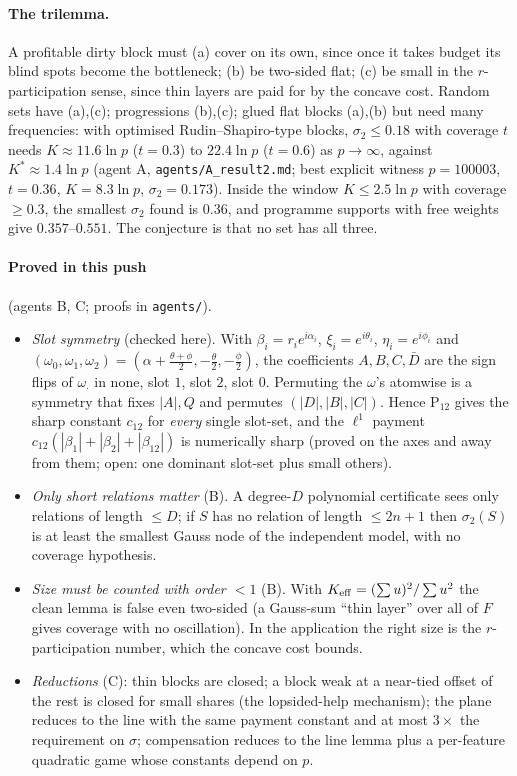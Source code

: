 \documentclass[11pt]{article}
\theoremstyle{definition}
\begin{document}
\paragraph{The trilemma.}  A profitable dirty block must (a) cover on its own, since once it takes budget its blind spots become the bottleneck; (b) be two-sided flat; (c) be small in the
$r$-participation sense, since thin layers are paid for by the concave cost.  Random sets have (a),(c); progressions (b),(c); glued flat blocks (a),(b) but need many frequencies: with optimised
Rudin--Shapiro-type blocks, $\sigma_2\le0.18$ with coverage $t$ needs $K\approx11.6\ln p$ ($t=0.3$) to $22.4\ln p$ ($t=0.6$) as $p\to\infty$, against
$K^*\approx1.4\ln p$ (agent A, \texttt{agents/A\_result2.md}; best explicit witness $p=100003$, $t=0.36$, $K=8.3\ln p$, $\sigma_2=0.173$).  Inside the window
$K\le2.5\ln p$ with coverage $\ge0.3$, the smallest $\sigma_2$ found is $0.36$, and programme supports with free weights give $0.357$--$0.551$.  The conjecture is that
no set has all three.

\paragraph{Proved in this push} (agents B, C; proofs in \texttt{agents/}).
\begin{itemize}
\item \emph{Slot symmetry} (checked here).  With $\beta_i=r_ie^{i\alpha_i}$, $\xi_i=e^{i\theta_i}$, $\eta_i=e^{i\phi_i}$ and $(\omega_0,\omega_1,\omega_2)=(\alpha+\frac{\theta+\phi}2,-\frac\theta2,-\frac\phi2)$, the
coefficients $A,B,C,\bar D$ are the sign flips of $\omega_\cdot$ in none, slot $1$, slot $2$, slot $0$.  Permuting the $\omega$'s atomwise is a symmetry that fixes $|A|,Q$ and permutes $(|D|,|B|,|C|)$.
Hence P$_{12}$ gives the sharp constant $c_{12}$ for \emph{every} single slot-set, and the $\ell^1$ payment $c_{12}(|\beta_1|+|\beta_2|+|\beta_{12}|)$ is numerically sharp (proved on the axes and
away from them; open: one dominant slot-set plus small others).
\item \emph{Only short relations matter} (B).  A degree-$D$ polynomial certificate sees only relations of length $\le D$; if $S$ has no relation of length $\le2n+1$ then $\sigma_2(S)$ is at
least the smallest Gauss node of the independent model, with no coverage hypothesis.
\item \emph{Size must be counted with order $<1$} (B).  With $K_{\rm eff}=(\sum u)^2/\sum u^2$ the clean lemma is false even two-sided (a Gauss-sum ``thin layer'' over all of $F$ gives coverage
with no oscillation).  In the application the right size is the $r$-participation number, which the concave cost bounds.
\item \emph{Reductions} (C): thin blocks are closed; a block weak at a near-tied offset of the rest is closed for small shares (the lopsided-help mechanism); the plane reduces to the
line with the same payment constant and at most $3\times$ the requirement on $\sigma$; compensation reduces to the line lemma plus a per-feature quadratic game whose constants depend on $p$.
\end{itemize}
\end{document}
